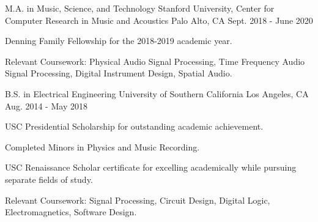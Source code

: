 

\begin{cventries}

    \cventry
    {M.A. in Music, Science, and Technology} %
    {Stanford University, Center for Computer Research in Music and Acoustics} %
    {Palo Alto, CA} %
    {Sept. 2018 - June 2020} %
    {
      \begin{cvitems} %
        \item {Denning Family Fellowship for the 2018-2019 academic year.}
        \item {Relevant Coursework: Physical Audio Signal Processing, Time Frequency Audio Signal Processing, Digital Instrument Design, Spatial Audio.}
      \end{cvitems}
    }

    \cventry
    {B.S. in Electrical Engineering} %
    {University of Southern California} %
    {Los Angeles, CA} %
    {Aug. 2014 - May 2018} %
    {
      \begin{cvitems} %
        \item {USC Presidential Scholarship for outstanding academic achievement.}
        \item {Completed Minors in Physics and Music Recording.}
        \item {USC Renaissance Scholar certificate for excelling academically while pursuing separate fields of study.}
        \item {Relevant Coursework: Signal Processing, Circuit Design, Digital Logic, Electromagnetics, Software Design.}
      \end{cvitems}
    }

\end{cventries}
